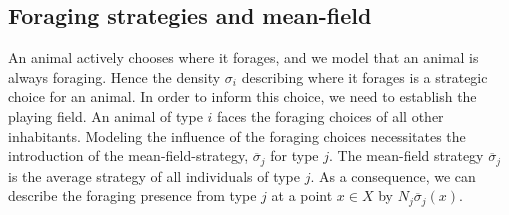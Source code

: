 \subsection{Foraging strategies and mean-field}
An animal actively chooses where it forages, and we model that an animal is always foraging. Hence the density $\sigma_i$ describing where it forages is a strategic choice for an animal. In order to inform this choice, we need to establish the playing field. An animal of type $i$ faces the foraging choices of all other inhabitants. Modeling the influence of the foraging choices necessitates the introduction of the mean-field-strategy, $\overbar{\sigma}_j$ for type $j$. The mean-field strategy $\overbar{\sigma}_j$ is the average strategy of all individuals of type $j$. As a consequence, we can describe the foraging presence from type $j$ at a point $x\in X$ by $N_j \overbar{\sigma}_j(x)$.


